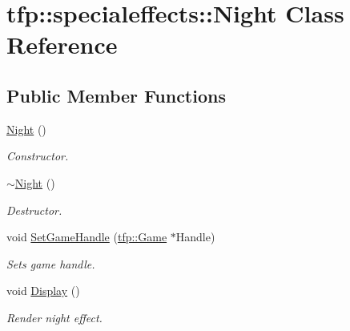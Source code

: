 \hypertarget{classtfp_1_1specialeffects_1_1_night}{}\section{tfp\+:\+:specialeffects\+:\+:Night Class Reference}
\label{classtfp_1_1specialeffects_1_1_night}
\subsection*{Public Member Functions}
\begin{DoxyCompactItemize}
\item 
\mbox{\label{classtfp_1_1specialeffects_1_1_night_a6e8fece76928d856e589996881bfbb90}} 
\mbox{\hyperlink{classtfp_1_1specialeffects_1_1_night_a6e8fece76928d856e589996881bfbb90}{Night}} ()
\begin{DoxyCompactList}\small\item\em Constructor. \end{DoxyCompactList}\item 
\mbox{\label{classtfp_1_1specialeffects_1_1_night_a24aab4e13a82752b128ec6c0a5402efa}} 
\mbox{\hyperlink{classtfp_1_1specialeffects_1_1_night_a24aab4e13a82752b128ec6c0a5402efa}{$\sim$\+Night}} ()
\begin{DoxyCompactList}\small\item\em Destructor. \end{DoxyCompactList}\item 
void \mbox{\hyperlink{classtfp_1_1specialeffects_1_1_night_acf90989e3e036bd3c45a8096809a31a5}{Set\+Game\+Handle}} (\mbox{\hyperlink{classtfp_1_1_game}{tfp\+::\+Game}} $\ast$Handle)
\begin{DoxyCompactList}\small\item\em Sets game handle. \end{DoxyCompactList}\item 
\mbox{\label{classtfp_1_1specialeffects_1_1_night_a015dba4b8752225e95d3f9d683a12391}} 
void \mbox{\hyperlink{classtfp_1_1specialeffects_1_1_night_a015dba4b8752225e95d3f9d683a12391}{Display}} ()
\begin{DoxyCompactList}\small\item\em Render night effect. \end{DoxyCompactList}\item 

\end{DoxyCompactItemize}
